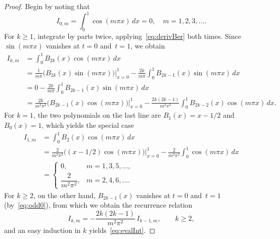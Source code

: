 \documentclass[11pt, oneside]{article}
\theoremstyle{plain}
\theoremstyle{definition}
\begin{document}
\begin{proof}
Begin by noting that
\[
  I_{0,m} = \int_0^{1} \cos(m\pi x)\,dx = 0, \quad m= 1,2,3,\dots.
\]
For $k \ge 1$, integrate by parts twice, applying~\eqref{eq:derivBer} both times.
Since $\sin(m \pi x)$ vanishes at $t=0$ and~$t=1$, we obtain
\begin{align*}
  I_{k,m} &= \int_0^{1} B_{2k}(x) \cos(m\pi x)\,dx \\
  &= \frac{1}{m\pi} \Big(B_{2k}(x) \sin(m \pi x) \Big)\Big|_{x=0}^{1}
  - \frac{2k}{m\pi} \int_0^{1} B_{2k-1}(x) \sin(m\pi x)\,dx \\
  &= 0 - \frac{2k}{m\pi} \int_0^{1} B_{2k-1}(x) \sin(m\pi x)\,dx \\
  &= \frac{2k}{m^{2} \pi^{2}} \Big(B_{2k-1}(x) \cos(m \pi x) \Big)\Big|_{x=0}^{1}
  - \frac{2k(2k-1)}{m^2\pi^2} \int_0^{1} B_{2k-2}(x) \cos(m\pi x)\,dx. 
\end{align*}
For $k = 1$, the two polynomials on the last line are $B_{1}(x) = x - 1/2$ and $B_{0}(x) = 1$, which yields the special case
\begin{align*}
  I_{1,m} &= \int_0^{1} B_2(x) \cos(m\pi x)\,dx \\
  &= \frac{2}{m^{2} \pi^{2}} \Big((x-1/2) \cos(m \pi x) \Big)\Big|_{x=0}^{1}
  - \frac{2}{m^2\pi^2} \int_0^{1} \cos(m\pi x)\,dx \\
  &= \begin{cases}
  0, & m=1,3,5,\dots, \\
  \dfrac{2}{m^2 \pi^2}, & m=2,4,6,\dots.
  \end{cases}
\end{align*}
For $k \geq 2$, on the other hand, $B_{2k-1}(x)$ vanishes at $t=0$ and~$t=1$ (by~\eqref{eq:odd0}), from which we obtain the recurrence relation
\[
  I_{k,m} = - \frac{2k(2k-1)}{m^{2} \pi^{2}} \,I_{k-1,m},
  \qquad
  k \geq 2,
\]
and an easy induction in $k$ yields~\eqref{eq:evalInt}.
\end{proof}
\end{document}
